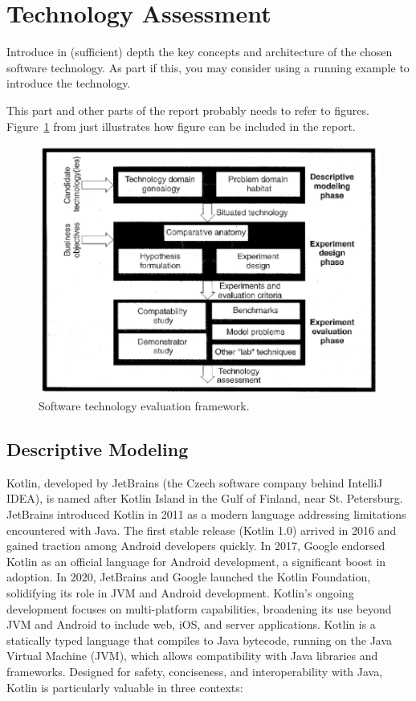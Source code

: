 \section{Technology Assessment}
\label{sec:technology}



Introduce in (sufficient) depth the key concepts and architecture of the chosen software technology. As part if this, you may consider using a running example to introduce the technology.

This part and other parts of the report probably needs to refer to
figures. Figure~\ref{fig:framework} from \cite{brown:96} just
illustrates how figure can be included in the report.

\begin{figure}[thb]
	\centering
	\includegraphics[scale=0.5]{figs/framework.png}
	\caption{Software technology evaluation framework.}
	\label{fig:framework}
\end{figure}

\subsection{Descriptive Modeling}

Kotlin, developed by JetBrains (the Czech software company behind IntelliJ IDEA), is named after Kotlin Island in the Gulf of Finland, near St. Petersburg. JetBrains introduced Kotlin in 2011 as a modern language addressing limitations encountered with Java. The first stable release (Kotlin 1.0) arrived in 2016 and gained traction among Android developers quickly. In 2017, Google endorsed Kotlin as an official language for Android development, a significant boost in adoption. In 2020, JetBrains and Google launched the Kotlin Foundation, solidifying its role in JVM and Android development. Kotlin’s ongoing development focuses on multi-platform capabilities, broadening its use beyond JVM and Android to include web, iOS, and server applications. Kotlin is a statically typed language that compiles to Java bytecode, running on the Java Virtual Machine (JVM), which allows compatibility with Java libraries and frameworks. Designed for safety, conciseness, and interoperability with Java, Kotlin is particularly valuable in three contexts:

